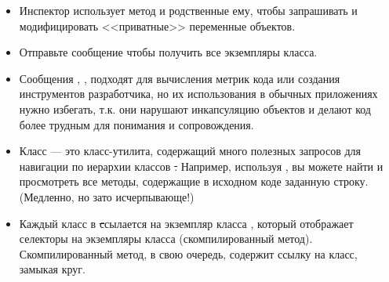 \documentclass[a4paper,10pt,twoside]{book}
\begin{document}
\begin{itemize}
\item Инспектор использует метод  и родственные ему, чтобы запрашивать и модифицировать <<приватные>> переменные объектов.
\item Отправьте сообщение  чтобы получить все экземпляры класса.
\item Сообщения , ,  \etc подходят для вычисления метрик кода или создания инструментов разработчика, но их использования в обычных приложениях нужно избегать, т.к. они нарушают инкапсуляцию объектов и делают код более трудным для понимания и сопровождения.
\item Класс  --- это класс-утилита, содержащий много полезных запросов для навигации по иерархии классов \st. Например, используя , вы можете найти и просмотреть все методы, содержащие в исходном коде заданную строку. (Медленно, но зато исчерпывающе!)
\item Каждый класс в \st ссылается на экземпляр класса , который отображает селекторы на экземпляры класса  (скомпилированный метод). Скомпилированный метод, в свою очередь, содержит ссылку на класс, замыкая круг. 

\end{itemize}
\end{document}
